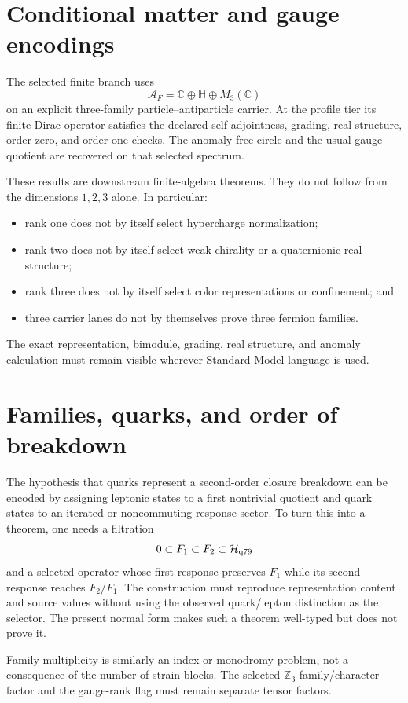 \documentclass[11pt]{article}
\begin{document}
\section{Conditional matter and gauge encodings}

The selected finite branch uses
\[
 \mathcal A_F=\mathbb C\oplus\mathbb H\oplus M_3(\mathbb C)
\]
on an explicit three-family particle--antiparticle carrier.  At the profile
tier its finite Dirac operator satisfies the declared self-adjointness,
grading, real-structure, order-zero, and order-one checks.  The anomaly-free
circle and the usual gauge quotient are recovered on that selected spectrum.

These results are downstream finite-algebra theorems.  They do not follow from
the dimensions $1,2,3$ alone.  In particular:
\begin{itemize}
\item rank one does not by itself select hypercharge normalization;
\item rank two does not by itself select weak chirality or a quaternionic real
structure;
\item rank three does not by itself select color representations or
confinement; and
\item three carrier lanes do not by themselves prove three fermion families.
\end{itemize}

The exact representation, bimodule, grading, real structure, and anomaly
calculation must remain visible wherever Standard Model language is used.

\section{Families, quarks, and order of breakdown}

The hypothesis that quarks represent a second-order closure breakdown can be
encoded by assigning leptonic states to a first nontrivial quotient and quark
states to an iterated or noncommuting response sector.  To turn this into a
theorem, one needs a filtration
\[
 0\subset F_1\subset F_2\subset\mathcal H_{\rm q79}
\]
and a selected operator whose first response preserves $F_1$ while its second
response reaches $F_2/F_1$.  The construction must reproduce representation
content and source values without using the observed quark/lepton distinction
as the selector.  The present normal form makes such a theorem well-typed but
does not prove it.

Family multiplicity is similarly an index or monodromy problem, not a
consequence of the number of strain blocks.  The selected $\mathbb Z_3$
family/character factor and the gauge-rank flag must remain separate tensor
factors.
\end{document}
